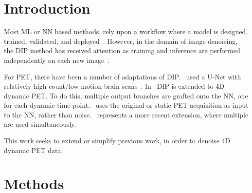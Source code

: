         \section{Introduction} \label{sec:pseudo_bayesian_dip_denoising_as_a_preprocessing_step_for_kinetic_modelling_in_dynamic_pet_appendix_introduction}
            Most \gls{ML} or \gls{NN} based methods, rely upon a workflow where a model is designed, trained, validated, and deployed~\parencite{Krose1993AnNetworks}. %
            However, in the domain of image denoising, the \gls{DIP} method has received attention as training and inference are performed independently on each new image~\parencite{Ulyanov2020DeepPrior}. %
            
            For \gls{PET}, there have been a number of adaptations of \gls{DIP}.~\parencite{Gong2019PETPrior} used a U-Net with relatively high count/low motion brain scans~\parencite{Weng2021INet:Segmentation}. In~\parencite{Hashimoto20214DNetwork} \gls{DIP} is extended to \gls{4D} dynamic \gls{PET}. To do this, multiple output branches are grafted onto the \gls{NN}, one for each dynamic time point.~\parencite{Hashimoto2019DynamicDatasets} uses the original or static \gls{PET} acquisition as input to the \gls{NN}, rather than noise.~\parencite{Yang2022SimultaneousPrior} represents a more recent extension, where multiple  are used simultaneously.
            
            This work seeks to extend or simplify previous work, in order to denoise \gls{4D} dynamic \gls{PET} data.
        
            
        \section{Methods}\label{sec:pseudo_bayesian_dip_denoising_as_a_preprocessing_step_for_kinetic_modelling_in_dynamic_pet_appendix_methods}
